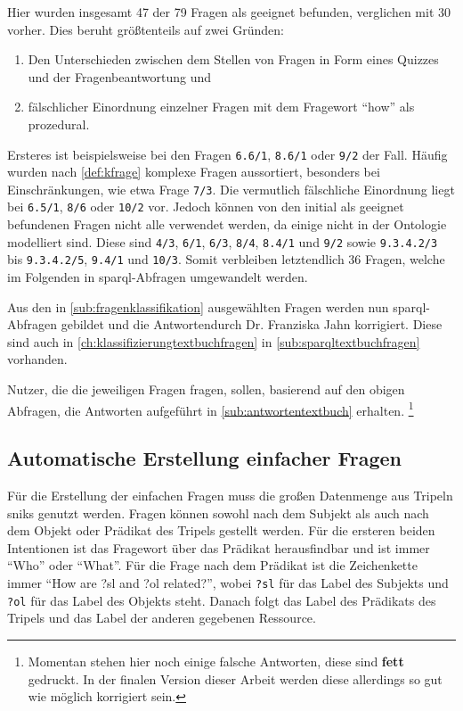 Hier wurden insgesamt 47 der 79 Fragen als geeignet befunden, verglichen mit 30 vorher.
Dies beruht größtenteils auf zwei Gründen:
\begin{enumerate}
  \item Den Unterschieden zwischen dem Stellen von Fragen in Form eines Quizzes und der Fragenbeantwortung und
  \item fälschlicher Einordnung einzelner Fragen mit dem Fragewort \enquote{how} als prozedural.
\end{enumerate}
Ersteres ist beispielsweise bei den Fragen \texttt{6.6/1}, \texttt{8.6/1} oder \texttt{9/2} der Fall.
Häufig wurden nach \cref{def:kfrage} komplexe Fragen aussortiert, besonders bei Einschränkungen, wie etwa Frage \texttt{7/3}.
Die vermutlich fälschliche Einordnung liegt bei \texttt{6.5/1}, \texttt{8/6} oder \texttt{10/2} vor.
Jedoch können von den initial als geeignet befundenen Fragen nicht alle verwendet werden, da einige nicht in der Ontologie modelliert sind.
Diese sind \texttt{4/3}, \texttt{6/1}, \texttt{6/3}, \texttt{8/4}, \texttt{8.4/1} und \texttt{9/2} sowie \texttt{9.3.4.2/3} bis \texttt{9.3.4.2/5}, \texttt{9.4/1} und \texttt{10/3}.
Somit verbleiben letztendlich 36 Fragen, welche im Folgenden in \ac{sparql}-Abfragen umgewandelt werden.

Aus den in \cref{sub:fragenklassifikation} ausgewählten Fragen werden nun \ac{sparql}-Abfragen gebildet
und die Antwortendurch Dr. Franziska Jahn korrigiert.
Diese sind auch in \cref{ch:klassifizierungtextbuchfragen} in \cref{sub:sparqltextbuchfragen} vorhanden.

Nutzer, die die jeweiligen Fragen fragen, sollen, basierend auf den obigen Abfragen, die Antworten aufgeführt in \cref{sub:antwortentextbuch} erhalten.
\footnote{Momentan stehen hier noch einige falsche Antworten, diese sind \textbf{fett} gedruckt.
In der finalen Version dieser Arbeit werden diese allerdings so gut wie möglich korrigiert sein.}

\subsection{Automatische Erstellung einfacher Fragen}

Für die Erstellung der einfachen Fragen muss die großen Datenmenge aus Tripeln \ac{snik}s genutzt werden.
Fragen können sowohl nach dem Subjekt als auch nach dem Objekt oder Prädikat des Tripels gestellt werden.
Für die ersteren beiden Intentionen ist das Fragewort über das Prädikat herausfindbar und ist immer \enquote{Who} oder \enquote{What}.
Für die Frage nach dem Prädikat ist die Zeichenkette immer \enquote{How are ?sl and ?ol related?}, wobei \texttt{?sl} für das Label des Subjekts und \texttt{?ol} für das Label des Objekts steht.
Danach folgt das Label des Prädikats des Tripels und das Label der anderen gegebenen Ressource.

